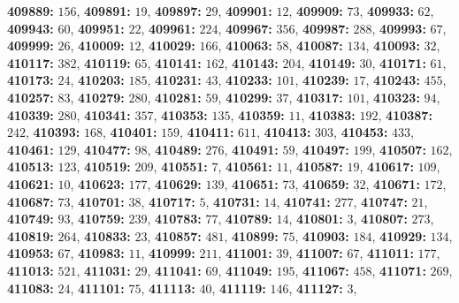 \textsf{\bfseries 409889:} $156$, \textsf{\bfseries 409891:} $19$, \textsf{\bfseries 409897:} $29$, \textsf{\bfseries 409901:} $12$, \textsf{\bfseries 409909:} $73$, \textsf{\bfseries 409933:} $62$, \textsf{\bfseries 409943:} $60$, \textsf{\bfseries 409951:} $22$, \textsf{\bfseries 409961:} $224$, \textsf{\bfseries 409967:} $356$, \textsf{\bfseries 409987:} $288$, \textsf{\bfseries 409993:} $67$, \textsf{\bfseries 409999:} $26$, \textsf{\bfseries 410009:} $12$, \textsf{\bfseries 410029:} $166$, \textsf{\bfseries 410063:} $58$, \textsf{\bfseries 410087:} $134$, \textsf{\bfseries 410093:} $32$, \textsf{\bfseries 410117:} $382$, \textsf{\bfseries 410119:} $65$, \textsf{\bfseries 410141:} $162$, \textsf{\bfseries 410143:} $204$, \textsf{\bfseries 410149:} $30$, \textsf{\bfseries 410171:} $61$, \textsf{\bfseries 410173:} $24$, \textsf{\bfseries 410203:} $185$, \textsf{\bfseries 410231:} $43$, \textsf{\bfseries 410233:} $101$, \textsf{\bfseries 410239:} $17$, \textsf{\bfseries 410243:} $455$, \textsf{\bfseries 410257:} $83$, \textsf{\bfseries 410279:} $280$, \textsf{\bfseries 410281:} $59$, \textsf{\bfseries 410299:} $37$, \textsf{\bfseries 410317:} $101$, \textsf{\bfseries 410323:} $94$, \textsf{\bfseries 410339:} $280$, \textsf{\bfseries 410341:} $357$, \textsf{\bfseries 410353:} $135$, \textsf{\bfseries 410359:} $11$, \textsf{\bfseries 410383:} $192$, \textsf{\bfseries 410387:} $242$, \textsf{\bfseries 410393:} $168$, \textsf{\bfseries 410401:} $159$, \textsf{\bfseries 410411:} $611$, \textsf{\bfseries 410413:} $303$, \textsf{\bfseries 410453:} $433$, \textsf{\bfseries 410461:} $129$, \textsf{\bfseries 410477:} $98$, \textsf{\bfseries 410489:} $276$, \textsf{\bfseries 410491:} $59$, \textsf{\bfseries 410497:} $199$, \textsf{\bfseries 410507:} $162$, \textsf{\bfseries 410513:} $123$, \textsf{\bfseries 410519:} $209$, \textsf{\bfseries 410551:} $7$, \textsf{\bfseries 410561:} $11$, \textsf{\bfseries 410587:} $19$, \textsf{\bfseries 410617:} $109$, \textsf{\bfseries 410621:} $10$, \textsf{\bfseries 410623:} $177$, \textsf{\bfseries 410629:} $139$, \textsf{\bfseries 410651:} $73$, \textsf{\bfseries 410659:} $32$, \textsf{\bfseries 410671:} $172$, \textsf{\bfseries 410687:} $73$, \textsf{\bfseries 410701:} $38$, \textsf{\bfseries 410717:} $5$, \textsf{\bfseries 410731:} $14$, \textsf{\bfseries 410741:} $277$, \textsf{\bfseries 410747:} $21$, \textsf{\bfseries 410749:} $93$, \textsf{\bfseries 410759:} $239$, \textsf{\bfseries 410783:} $77$, \textsf{\bfseries 410789:} $14$, \textsf{\bfseries 410801:} $3$, \textsf{\bfseries 410807:} $273$, \textsf{\bfseries 410819:} $264$, \textsf{\bfseries 410833:} $23$, \textsf{\bfseries 410857:} $481$, \textsf{\bfseries 410899:} $75$, \textsf{\bfseries 410903:} $184$, \textsf{\bfseries 410929:} $134$, \textsf{\bfseries 410953:} $67$, \textsf{\bfseries 410983:} $11$, \textsf{\bfseries 410999:} $211$, \textsf{\bfseries 411001:} $39$, \textsf{\bfseries 411007:} $67$, \textsf{\bfseries 411011:} $177$, \textsf{\bfseries 411013:} $521$, \textsf{\bfseries 411031:} $29$, \textsf{\bfseries 411041:} $69$, \textsf{\bfseries 411049:} $195$, \textsf{\bfseries 411067:} $458$, \textsf{\bfseries 411071:} $269$, \textsf{\bfseries 411083:} $24$, \textsf{\bfseries 411101:} $75$, \textsf{\bfseries 411113:} $40$, \textsf{\bfseries 411119:} $146$, \textsf{\bfseries 411127:} $3$, 
